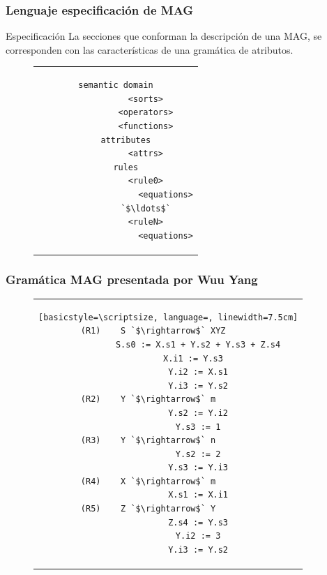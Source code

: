 \documentclass[10pt, xcolor=table, xcolor=dvipsnames]{beamer}
\begin{document}
\begin{frame}[fragile]
    \frametitle{Lenguaje especificación de MAG}

    \begin{block}{Especificación}
    La secciones que conforman la descripción de una MAG, se corresponden con las características de una gramática de atributos.
    \end{block}
    
\begin{figure}[h]
\begin{center}
\begin{tabular}{c}
 \begin{lstlisting}[language=specmag, basicstyle=\small, linewidth=7cm]
    semantic domain
            <sorts>
            <operators>
            <functions>
    attributes
            <attrs>
    rules
            <rule0>
                    <equations>
            `$\ldots$`
            <ruleN>
                    <equations>
\end{lstlisting} 
\end{tabular}
\end{center}
\end{figure}
\end{frame}

\begin{frame}[fragile]
    \frametitle{Gramática MAG presentada por Wuu Yang}

\begin{figure}[h]
\begin{center}
\begin{tabular}{c}
\begin{lstlisting}[basicstyle=\scriptsize, language=, linewidth=7.5cm]
(R1)    S `$\rightarrow$` XYZ      
            S.s0 := X.s1 + Y.s2 + Y.s3 + Z.s4
            X.i1 := Y.s3  
            Y.i2 := X.s1
            Y.i3 := Y.s2
(R2)    Y `$\rightarrow$` m        
            Y.s2 := Y.i2
            Y.s3 := 1
(R3)    Y `$\rightarrow$` n        
            Y.s2 := 2
            Y.s3 := Y.i3
(R4)    X `$\rightarrow$` m        
            X.s1 := X.i1
(R5)    Z `$\rightarrow$` Y        
            Z.s4 := Y.s3
            Y.i2 := 3
            Y.i3 := Y.s2
\end{lstlisting} 
\end{tabular}
\end{center}
\end{figure}
\end{frame}
\end{document}
